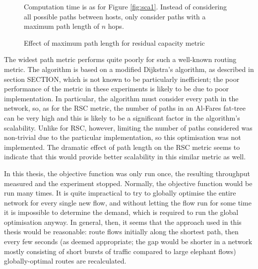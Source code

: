 \begin{figure}
\centering

\caption{Effect of maximum path length for residual capacity metric}
\label{fig:sca2}
Computation time is as for Figure \ref{fig:sca1}. Instead of considering all possible paths between hosts, only consider paths with a maximum path length of $n$ hops.
\end{figure}

The widest path metric performs quite poorly for such a well-known routing metric. The algorithm is based on a modified Dijkstra's algorithm, as described in section SECTION, which is not known to be particularly inefficient; the poor performance of the metric in these experiments is likely to be due to poor implementation. In particular, the algorithm must consider every path in the network, so, as for the RSC metric, the number of paths in an Al-Fares fat-tree can be very high and this is likely to be a significant factor in the algorithm's scalability. Unlike for RSC, however, limiting the number of paths considered was non-trivial due to the particular implementation, so this optimisation was not implemented. The dramatic effect of path length on the RSC metric seems to indicate that this would provide better scalability in this similar metric as well.

In this thesis, the objective function was only run once, the resulting throughput measured and the experiment stopped. Normally, the objective function would be run many times. It is quite impractical to try to globally optimise the entire network for every single new flow, and without letting the flow run for some time it is impossible to determine the demand, which is required to run the global optimisation anyway. In general, then, it seems that the approach used in this thesis would be reasonable: route flows initially along the shortest path, then every few seconds (as deemed appropriate; the gap would be shorter in a network mostly consisting of short bursts of traffic compared to large elephant flows) globally-optimal routes are recalculated.

